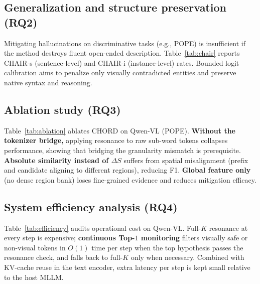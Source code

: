 \subsection{Generalization and structure preservation (RQ2)}

Mitigating hallucinations on discriminative tasks (e.g., POPE) is insufficient if the method destroys fluent open-ended description. Table~\ref{tab:chair} reports CHAIR-s (sentence-level) and CHAIR-i (instance-level) rates. Bounded logit calibration aims to penalize only visually contradicted entities and preserve native syntax and reasoning.

\subsection{Ablation study (RQ3)}

Table~\ref{tab:ablation} ablates CHORD on Qwen-VL (POPE). \textbf{Without the tokenizer bridge,} applying resonance to raw sub-word tokens collapses performance, showing that bridging the granularity mismatch is prerequisite. \textbf{Absolute similarity instead of $\Delta S$} suffers from spatial misalignment (prefix and candidate aligning to different regions), reducing F1. \textbf{Global feature only} (no dense region bank) loses fine-grained evidence and reduces mitigation efficacy.

\subsection{System efficiency analysis (RQ4)}

Table~\ref{tab:efficiency} audits operational cost on Qwen-VL. Full-$K$ resonance at every step is expensive; \textbf{continuous Top-$1$ monitoring} filters visually safe or non-visual tokens in $O(1)$ time per step when the top hypothesis passes the resonance check, and falls back to full-$K$ only when necessary. Combined with KV-cache reuse in the text encoder, extra latency per step is kept small relative to the host MLLM.
